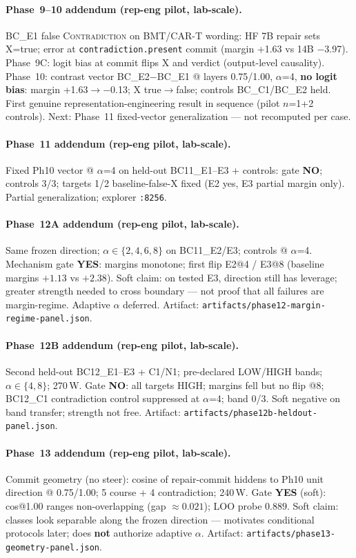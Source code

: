 \documentclass[11pt,a4paper]{article}
\newcommand{\con}{\textsc{Contradiction}}
\begin{document}
\paragraph{Phase~9--10 addendum (rep-eng pilot, lab-scale).}
BC\_E1 false \con{} on BMT/CAR-T wording: HF 7B repair sets X=true; error at \texttt{contradiction.present} commit (margin +1.63 vs 14B $-$3.97).
Phase~9C: logit bias at commit flips X and verdict (output-level causality).
Phase~10: contrast vector BC\_E2$-$BC\_E1 @ layers 0.75/1.00, $\alpha$=4, \textbf{no logit bias}: margin +1.63$\rightarrow$$-$0.13; X true$\rightarrow$false; controls BC\_C1/BC\_E2 held.
First genuine representation-engineering result in sequence (pilot $n$=1+2 controls).
Next: Phase~11 fixed-vector generalization --- not recomputed per case.

\paragraph{Phase~11 addendum (rep-eng pilot, lab-scale).}
Fixed Ph10 vector @ $\alpha$=4 on held-out BC11\_E1--E3 + controls: gate \textbf{NO}; controls 3/3; targets 1/2 baseline-false-X fixed (E2 yes, E3 partial margin only). Partial generalization; explorer \texttt{:8256}.

\paragraph{Phase~12A addendum (rep-eng pilot, lab-scale).}
Same frozen direction; $\alpha\in\{2,4,6,8\}$ on BC11\_E2/E3; controls @ $\alpha$=4.
Mechanism gate \textbf{YES}: margins monotone; first flip E2@4 / E3@8 (baseline margins $+1.13$ vs $+2.38$).
Soft claim: on tested E3, direction still has leverage; greater strength needed to cross boundary --- not proof that all failures are margin-regime.
Adaptive $\alpha$ deferred. Artifact: \texttt{artifacts/phase12-margin-regime-panel.json}.

\paragraph{Phase~12B addendum (rep-eng pilot, lab-scale).}
Second held-out BC12\_E1--E3 + C1/N1; pre-declared LOW/HIGH bands; $\alpha\in\{4,8\}$; 270\,W.
Gate \textbf{NO}: all targets HIGH; margins fell but no flip @8; BC12\_C1 contradiction control suppressed at $\alpha$=4; band 0/3.
Soft negative on band transfer; strength not free. Artifact: \texttt{artifacts/phase12b-heldout-panel.json}.

\paragraph{Phase~13 addendum (rep-eng pilot, lab-scale).}
Commit geometry (no steer): cosine of repair-commit hiddens to Ph10 unit direction @ 0.75/1.00; 5 course + 4 contradiction; 240\,W.
Gate \textbf{YES} (soft): cos@1.00 ranges non-overlapping (gap $\approx 0.021$); LOO probe $0.889$.
Soft claim: classes look separable along the frozen direction --- motivates conditional protocols later; does \textbf{not} authorize adaptive $\alpha$.
Artifact: \texttt{artifacts/phase13-geometry-panel.json}.
\end{document}
